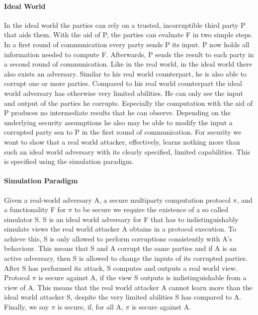 \paragraph{Ideal World}%
In the ideal world the parties can rely on a trusted, incorruptible third party P that aids them. With the aid of P, the parties can evaluate F in two simple steps. In a first round of communication every party sends P its input. P now holds all information needed to compute F. Afterwards, P sends the result to each party in a second round of communication. Like in the real world, in the ideal world there also exists an adversary. Similar to his real world counterpart, he is also able to corrupt one or more parties. Compared to his real world counterpart the ideal world adversary has otherwise very limited abilities. He can only see the input and output of the parties he corrupts. Especially the computation with the aid of P produces no intermediate results that he can observe. Depending on the underlying security assumptions he also may be able to modify the input a corrupted party sen to P in the first round of communication. For security we want to show that a real world attacker, effectively, learns nothing more than such an ideal world adversary with its clearly specified, limited capabilities. This is specified using the simulation paradigm.

\paragraph{Simulation Paradigm}
Given a real-world adversary A, a secure multiparty computation protocol $\pi $, and a functionality F for $\pi $ to be secure we require the existence of a so called simulator S.
S is an ideal world adversary for F that has to indistinguishably simulate views the real world attacker A obtains in a protocol execution. To achieve this, S is only allowed to perform corruptions consistently with A's behaviour. This means that S and A corrupt the same parties and if A is an active adversary, then S is allowed to change the inputs of its corrupted parties. After S has performed its attack, S computes and  outputs a real world view. Protocol $\pi $ is secure against A, if the view S outputs is indistinguishable from a view of A. This means that the real world attacker A cannot learn more than the ideal world attacker S, despite the very limited abilities S has compared to A. Finally, we say $\pi $ is secure, if, for all A, $\pi $ is secure against A. 

